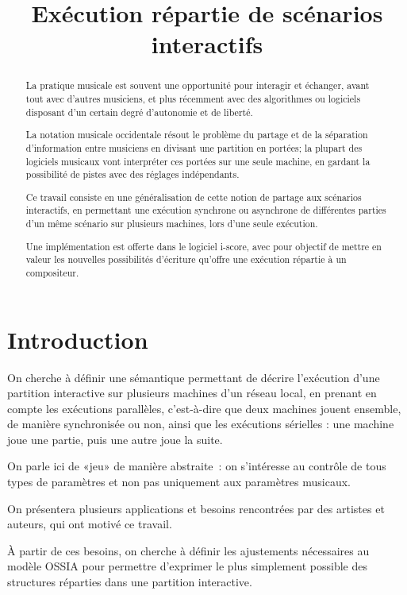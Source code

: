 \documentclass{article}
\title{Exécution répartie de scénarios interactifs}
\newcommand\ossia{OSSIA\xspace}
\begin{document}
\maketitle
\begin{abstract}
    La pratique musicale est souvent une opportunité pour interagir et échanger, 
    avant tout avec d'autres musiciens, et plus récemment avec des algorithmes ou logiciels 
    disposant d'un certain degré d'autonomie et de liberté.
    
    La notation musicale occidentale résout le problème du partage et de la séparation d'information entre musiciens 
    en divisant une partition en portées; la plupart des logiciels musicaux vont interpréter ces portées sur une seule machine, en gardant la possibilité de pistes avec des réglages indépendants. 
    
    Ce travail consiste en une généralisation de cette notion de partage aux scénarios interactifs, en permettant une exécution synchrone ou asynchrone de différentes parties d'un même scénario sur plusieurs machines, lors d'une seule exécution.
    
    Une implémentation est offerte dans le logiciel i-score, avec pour objectif de mettre en valeur 
    les nouvelles possibilités d'écriture qu'offre une exécution répartie à un compositeur.
\end{abstract}

\section{Introduction}
On cherche à définir une sémantique permettant de décrire l'exécution d'une partition interactive sur plusieurs machines d'un réseau local, en prenant en compte les exécutions parallèles, c'est-à-dire que deux machines jouent ensemble, de manière synchronisée ou non, ainsi que les exécutions sérielles : une machine joue une partie, puis une autre joue la suite.

On parle ici de «jeu» de manière abstraite~: on s'intéresse au contrôle de tous types de paramètres et non pas uniquement aux paramètres musicaux.

On présentera plusieurs applications et besoins rencontrées par des artistes et auteurs, qui ont motivé ce travail.

À partir de ces besoins, on cherche à définir les ajustements nécessaires au modèle \ossia pour permettre d'exprimer le plus simplement possible des structures réparties dans une partition interactive.
\end{document}

